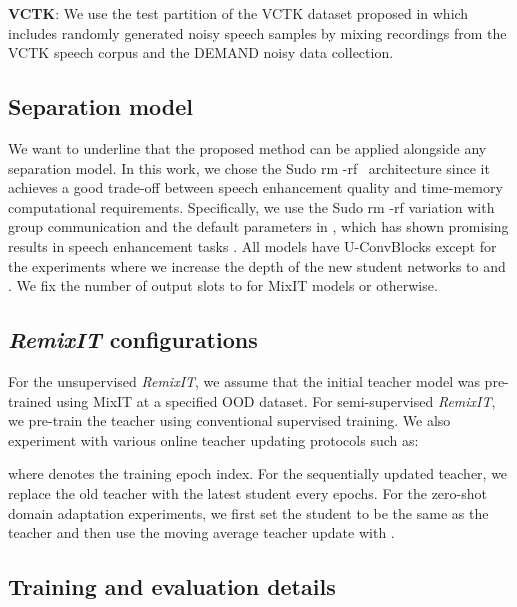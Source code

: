 \documentclass{article}
\begin{document}
\noindent \textbf{VCTK}: We use the test partition of the VCTK dataset proposed in \cite{giri2019attention_VCTKDEMAND_testSet} which includes  randomly generated noisy speech samples by mixing recordings from the VCTK speech corpus \cite{vctk} and the DEMAND \cite{demand_Dataset} noisy data collection.


\subsection{Separation model}
\label{sec:exp_fram:model}
We want to underline that the proposed method can be applied alongside any separation model. In this work, we chose the Sudo rm -rf~\cite{tzinis2020sudo} architecture since it achieves a good trade-off between speech enhancement quality and time-memory computational requirements. Specifically, we use the Sudo rm -rf variation with group communication \cite{luo2021ultra} and the default parameters in \cite{tzinis2021compute}, which has shown promising results in speech enhancement tasks \cite{tzinis2021separate}. All models have  U-ConvBlocks except for the experiments where we increase the depth of the new student networks to  and . We fix the number of output slots to  for MixIT models or  otherwise.


\subsection{\textit{RemixIT} configurations}
\label{sec:exp_fram:remixit_coinfigs}
For the unsupervised \textit{RemixIT}, we assume that the initial teacher model was pre-trained using MixIT at a specified OOD dataset. For semi-supervised \textit{RemixIT}, we pre-train the teacher using conventional supervised training. We also experiment with various online teacher updating protocols such as:

where  denotes the training epoch index. For the sequentially updated teacher, we replace the old teacher with the latest student every  epochs. For the zero-shot domain adaptation experiments, we first set the student to be the same as the teacher  and then use the moving average teacher update with .






\subsection{Training and evaluation details}
\label{sec:exp_fram:train_eval_details}
\end{document}
